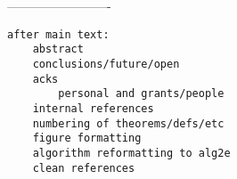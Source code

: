 -------------------------

\begin{verbatim}
after main text:
    abstract
    conclusions/future/open
    acks
    	personal and grants/people
    internal references
    numbering of theorems/defs/etc
    figure formatting
    algorithm reformatting to alg2e
    clean references
\end{verbatim}

